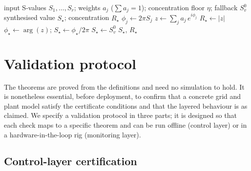 \documentclass[11pt,a4paper,twocolumn]{article}
\theoremstyle{thmstyle}
\theoremstyle{definition}
\theoremstyle{remark}
\newcommand{\Rstar}{R_{\star}}
\begin{document}
\begin{algorithm}[t]
\caption{Sensor synthesis (time$\leftrightarrow$frequency)}
\label{alg:synth}
\begin{algorithmic}[1]
\Require input S-values $S_1,\dots,S_r$; weights $a_j$ ($\sum a_j=1$);
concentration floor $\eta$; fallback $S_v^0$
\Ensure synthesised value $S_\star$; concentration $\Rstar$
  \State $\phi_j \gets 2\pi S_j$
\EndFor
\State $z \gets \sum_{j} a_j\,e^{i\phi_j}$
\State $\Rstar \gets |z|$
\If{$\Rstar \ge \eta$}
  \State $\phi_\star \gets \arg(z)$; \quad $S_\star \gets \phi_\star / 2\pi$
\Else
  \State $S_\star \gets S_v^0$
\EndIf
\State \Return $S_\star$, $\Rstar$
\end{algorithmic}
\end{algorithm}

\section{Validation protocol}
\label{sec:validation}

The theorems are proved from the definitions and need no simulation to
hold. It is nonetheless essential, before deployment, to confirm that a
concrete grid and plant model satisfy the certificate conditions and that
the layered behaviour is as claimed. We specify a validation protocol in
three parts; it is designed so that each check maps to a specific theorem
and can be run offline (control layer) or in a hardware-in-the-loop rig
(monitoring layer).

\subsection{Control-layer certification}
\end{document}

